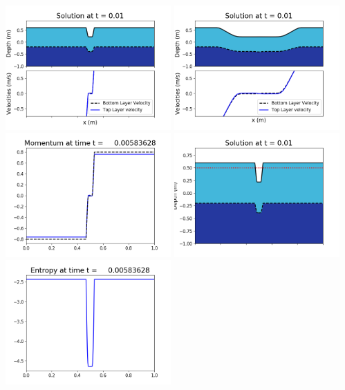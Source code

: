 \documentclass[11pt]{article}
\begin{document}
\vskip 10pt 
\includegraphics[width=0.475\textwidth]{frame0017fig1001.png}
\includegraphics[width=0.475\textwidth]{frame0017fig1002.png}
\vskip 10pt 
\includegraphics[width=0.475\textwidth]{frame0017fig1003.png}
\includegraphics[width=0.475\textwidth]{frame0017fig1006.png}
\vskip 10pt 
\includegraphics[width=0.475\textwidth]{frame0017fig1007.png}
\end{document}
